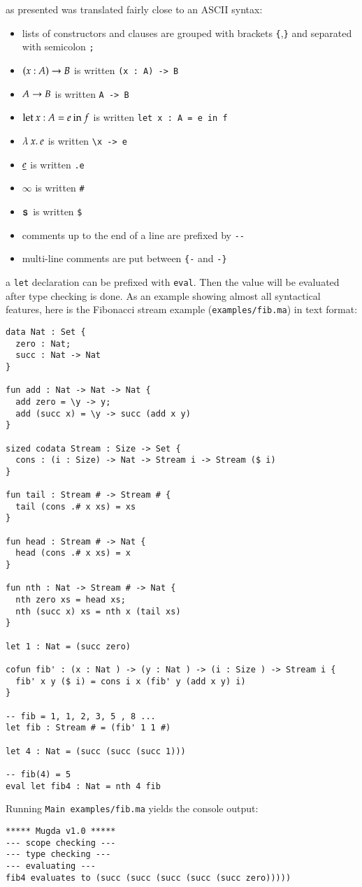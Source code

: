 \mugda as presented was translated fairly close to an ASCII syntax:
\begin{itemize}
\item
lists of constructors and clauses are grouped with brackets \texttt{\{},\texttt{\}} and separated with semicolon \texttt{;}
\item
$( x : A ) \rightarrow{B}$ is written \texttt{(x : A) -> B }
\item
$A \rightarrow B$ is written \texttt{A -> B}
\item
$\mathrm{let}\: x : A = e \: \mathrm{in}\:{f}$ is written \texttt{let x : A = e in f}
\item
$ \lambda\: x .\:e$ is written \verb+\x -> e +
\item
$ \underline{e}$ is written \texttt{.e} 
\item
$ \infty$ is written \texttt{\#} 
\item
$\mathsf{s}\,$ is written \texttt{\$}
\item
comments up to the end of a line are prefixed by \verb+--+
\item
multi-line comments are put between \verb+{-+ and \verb+-}+
\end{itemize}
a \texttt{let} declaration can be prefixed with \texttt{eval}. Then the value will be evaluated after type checking is done.
As an example showing almost all syntactical features, here is the Fibonacci stream example (\texttt{examples/fib.ma}) in text format:
\begin{verbatim}
data Nat : Set {
  zero : Nat;
  succ : Nat -> Nat 
}

fun add : Nat -> Nat -> Nat {
  add zero = \y -> y;
  add (succ x) = \y -> succ (add x y)
}

sized codata Stream : Size -> Set {
  cons : (i : Size) -> Nat -> Stream i -> Stream ($ i)
}
 
fun tail : Stream # -> Stream # {
  tail (cons .# x xs) = xs
}

fun head : Stream # -> Nat {
  head (cons .# x xs) = x
}

fun nth : Nat -> Stream # -> Nat {
  nth zero xs = head xs;
  nth (succ x) xs = nth x (tail xs) 
}

let 1 : Nat = (succ zero)

cofun fib' : (x : Nat ) -> (y : Nat ) -> (i : Size ) -> Stream i {
  fib' x y ($ i) = cons i x (fib' y (add x y) i)
} 

-- fib = 1, 1, 2, 3, 5 , 8 ...
let fib : Stream # = (fib' 1 1 #)

let 4 : Nat = (succ (succ (succ 1)))

-- fib(4) = 5 
eval let fib4 : Nat = nth 4 fib 
\end{verbatim}
Running \texttt{Main examples/fib.ma} yields the console output:
\begin{verbatim}
***** Mugda v1.0 *****
--- scope checking ---
--- type checking ---
--- evaluating ---
fib4 evaluates to (succ (succ (succ (succ (succ zero)))))
\end{verbatim}

